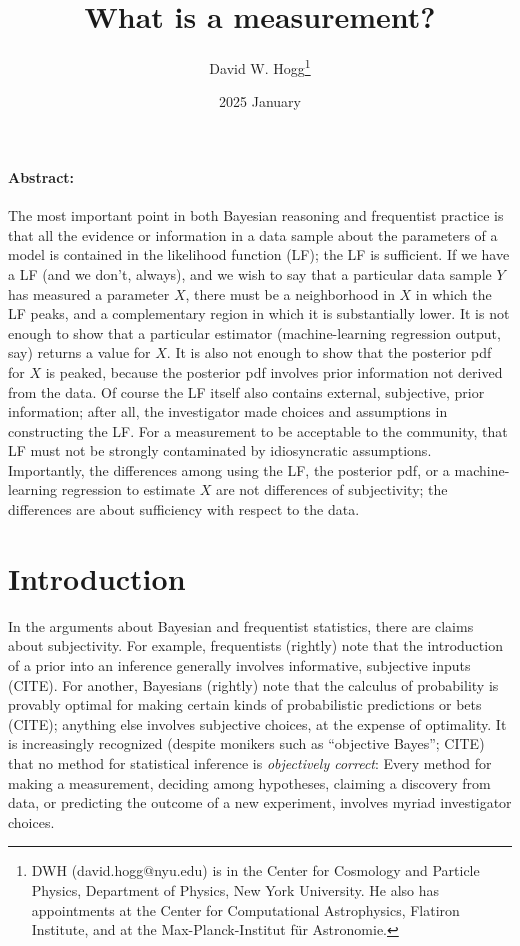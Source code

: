 \documentclass{article}
\title{\bfseries
What is a measurement?}
\author{David W. Hogg\footnote{%
DWH (david.hogg@nyu.edu) is in the Center for Cosmology and Particle Physics, Department of Physics, New York University.
He also has appointments at the Center for Computational Astrophysics, Flatiron Institute, and at the Max-Planck-Institut f\"ur Astronomie.}}
\date{2025 January}
\begin{document}
\maketitle\thispagestyle{empty}

\paragraph{Abstract:}
The most important point in both Bayesian reasoning and frequentist practice is that all the evidence or information in a data sample about the parameters of a model is contained in the likelihood function (LF); the LF is sufficient.
If we have a LF (and we don't, always), and we wish to say that a particular data sample $Y$ has measured a parameter $X$, there must be a neighborhood in $X$ in which the LF peaks, and a complementary region in which it is substantially lower.
It is not enough to show that a particular estimator (machine-learning regression output, say) returns a value for $X$.
It is also not enough to show that the posterior pdf for $X$ is peaked, because the posterior pdf involves prior information not derived from the data.
Of course the LF itself also contains external, subjective, prior information; after all, the investigator made choices and assumptions in constructing the LF.
For a measurement to be acceptable to the community, that LF must not be strongly contaminated by idiosyncratic assumptions.
Importantly, the differences among using the LF, the posterior pdf, or a machine-learning regression to estimate $X$ are not differences of subjectivity; the differences are about sufficiency with respect to the data.

\section{Introduction}
In the arguments about Bayesian and frequentist statistics, there are claims about subjectivity.
For example, frequentists (rightly) note that the introduction of a prior into an inference generally involves informative, subjective inputs (CITE).
For another, Bayesians (rightly) note that the calculus of probability is provably optimal for making certain kinds of probabilistic predictions or bets (CITE); anything else involves subjective choices, at the expense of optimality.
It is increasingly recognized (despite monikers such as ``objective Bayes''; CITE) that no method for statistical inference is \emph{objectively correct}:
Every method for making a measurement, deciding among hypotheses, claiming a discovery from data, or predicting the outcome of a new experiment, involves myriad investigator choices.
\end{document}
